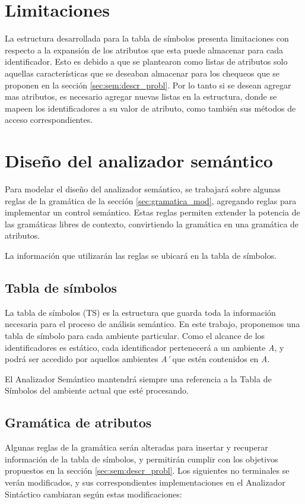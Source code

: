 \section{Limitaciones}
La estructura desarrollada para la tabla de símbolos presenta limitaciones con respecto a la expansión de los atributos que esta puede almacenar para cada identificador. Esto es debido a que se plantearon como listas de atributos solo aquellas características que se deseaban almacenar para los chequeos que se proponen en la sección \ref{sec:sem:descr_probl}. Por lo tanto si se desean agregar mas atributos, es necesario agregar nuevas listas en la estructura, donde se mapeen los identificadores a su valor de atributo, como también sus métodos de acceso correspondientes.

\section{Diseño del analizador semántico}
Para modelar el diseño del analizador semántico, se trabajará sobre algunas reglas de la gramática de la sección \ref{sec:gramatica_mod}, agregando reglas para implementar un control semántico. Estas reglas permiten extender la potencia de las gramáticas libres de contexto, convirtiendo la gramática en una gramática de atributos.

La información que utilizarán las reglas se ubicará en la tabla de símbolos.

\subsection{Tabla de símbolos}
La tabla de símbolos (TS) es la estructura que guarda toda la información necesaria para el proceso de análisis semántico. En este trabajo, proponemos una tabla de símbolo para cada ambiente particular.
Como el alcance de los identificadores es estático, cada identificador pertenecerá a un ambiente \emph{A}, y podrá ser accedido por aquellos ambientes \emph{A'} que estén contenidos en \emph{A}.

El Analizador Semántico mantendrá siempre una referencia a la Tabla de Símbolos del ambiente actual que esté procesando. 

\subsection{Gramática de atributos}
\label{sec:sem:gram_atrib}
Algunas reglas de la gramática serán alteradas para insertar y recuperar información de la tabla de símbolos, y permitirán cumplir con los objetivos propuestos en la sección \ref{sec:sem:descr_probl}.
Los siguientes no terminales se verán modificados, y sus correspondientes implementaciones en el Analizador Sintáctico cambiaran según estas modificaciones:

